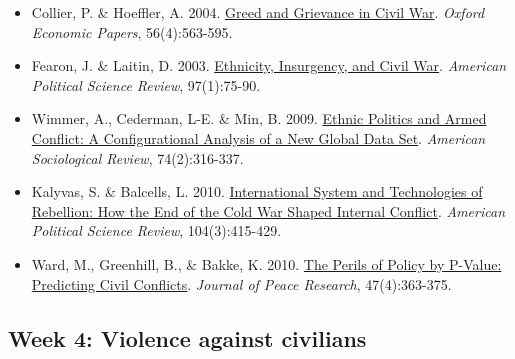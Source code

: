 \documentclass[12pt,]{article}
\providecommand{\tightlist}{%
  \setlength{\itemsep}{0pt}\setlength{\parskip}{0pt}}
\begin{document}
\begin{itemize}
\tightlist
\item
  Collier, P. \& Hoeffler, A. 2004.
  \href{https://academic.oup.com/oep/article-abstract/56/4/563/2361902}{Greed
  and Grievance in Civil War}. \emph{Oxford Economic Papers},
  56(4):563-595.
\item
  Fearon, J. \& Laitin, D. 2003.
  \href{https://www.cambridge.org/core/journals/american-political-science-review/article/ethnicity-insurgency-and-civil-war/B1D5D0E7C782483C5D7E102A61AD6605}{Ethnicity,
  Insurgency, and Civil War}. \emph{American Political Science Review},
  97(1):75-90.
\item
  Wimmer, A., Cederman, L-E. \& Min, B. 2009.
  \href{https://doi.org/10.1177\%2F000312240907400208}{Ethnic Politics
  and Armed Conflict: A Configurational Analysis of a New Global Data
  Set}. \emph{American Sociological Review}, 74(2):316-337.
\item
  Kalyvas, S. \& Balcells, L. 2010.
  \href{https://doi.org/10.1017/S0003055410000286}{International System
  and Technologies of Rebellion: How the End of the Cold War Shaped
  Internal Conflict}. \emph{American Political Science Review},
  104(3):415-429.
\item
  Ward, M., Greenhill, B., \& Bakke, K. 2010.
  \href{http://journals.sagepub.com/doi/abs/10.1177/0022343309356491}{The
  Perils of Policy by P-Value: Predicting Civil Conflicts}.
  \emph{Journal of Peace Research}, 47(4):363-375.
\end{itemize}

\hypertarget{week-4-violence-against-civilians}{%
\subsection{Week 4: Violence against
civilians}\label{week-4-violence-against-civilians}}
\end{document}
